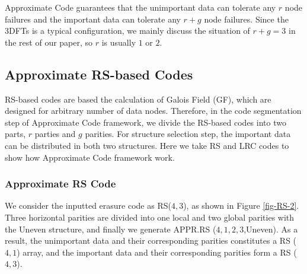 \documentclass[sigconf]{acmart}
\begin{document}
Approximate Code guarantees that the unimportant data can tolerate any $r$ node failures and the important data can tolerate any $r+g$ node failures.
Since the 3DFTs is a typical configuration, we mainly discuss the situation of $r+g=3$ in the rest of our paper, so $r$ is usually $1$ or $2$.%

\subsection{Approximate RS-based Codes}\label{appr-rsbased}
RS-based codes are based the calculation of Galois Field (GF), which are designed for arbitrary number of data nodes. Therefore, in the code segmentation step of  Approximate Code framework, we divide the RS-based codes into two parts, $r$ parties and $g$ parities. For structure selection step, the important data can be distributed in both two structures. Here we take RS and LRC codes to show how Approximate Code framework work.


\subsubsection{Approximate RS Code}
We consider the inputted erasure code as RS($4,3$), as shown in Figure \ref{fig-RS-2}. Three horizontal parities are divided into one local and two global parities with the Uneven structure, and finally we generate APPR.RS ($4,1,2,3$,Uneven).
As a result, the unimportant data and their corresponding parities constitutes a RS ($4,1$) array, and the important data and their corresponding parities form a RS ($4,3$).
\end{document}
